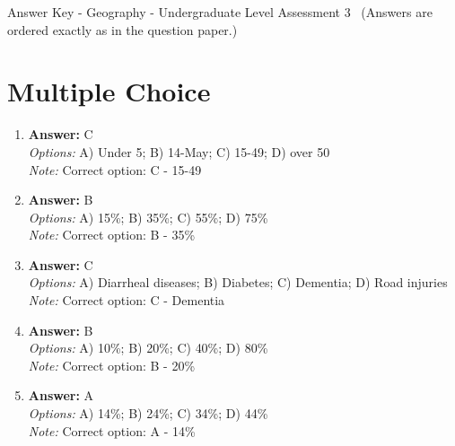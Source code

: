 \documentclass[12pt]{article}
\begin{document}
\begin{center}
Answer Key - Geography - Undergraduate Level Assessment 3 \
\small (Answers are ordered exactly as in the question paper.)
\end{center}

\section*{Multiple Choice}
\begin{enumerate}[label=\arabic*.]
\item \textbf{Answer:} C
\\ \textit{Options:} A) Under 5; B) 14-May; C) 15-49; D) over 50
\\ \textit{Note:} Correct option: C - 15-49
\item \textbf{Answer:} B
\\ \textit{Options:} A) 15\%; B) 35\%; C) 55\%; D) 75\%
\\ \textit{Note:} Correct option: B - 35\%
\item \textbf{Answer:} C
\\ \textit{Options:} A) Diarrheal diseases; B) Diabetes; C) Dementia; D) Road injuries
\\ \textit{Note:} Correct option: C - Dementia
\item \textbf{Answer:} B
\\ \textit{Options:} A) 10\%; B) 20\%; C) 40\%; D) 80\%
\\ \textit{Note:} Correct option: B - 20\%
\item \textbf{Answer:} A
\\ \textit{Options:} A) 14\%; B) 24\%; C) 34\%; D) 44\%
\\ \textit{Note:} Correct option: A - 14\%
\end{enumerate}
\end{document}
